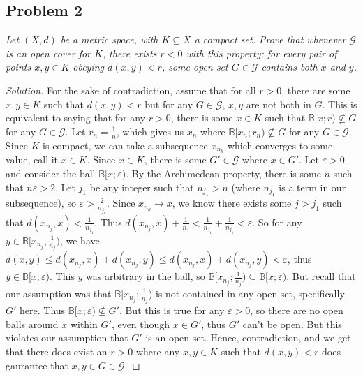 \documentclass{article}
\newcommand{\ep}{{\varepsilon}}
\begin{document}
\subsection*{Problem 2}
{\it Let $(X, d)$ be a metric space, with $K \subseteq X$ a compact set.
Prove that whenever $\mathcal{G}$ is an open cover for $K$,
there exists $r < 0$ with this property:
for every pair of points $x,y \in K$ obeying $d(x,y) < r$,
some open set $G \in \mathcal{G}$ contains both $x$ and $y$.}

\begin{proof}[Solution]\let\qed\relax
	For the sake of contradiction,
	assume that for all $r>0$, there are some $x, y \in K$ such that
	$d(x,y) < r$ but for any $G \in \mathcal{G}$, $x,y$ are not both in $G$.
	This is equivalent to saying that for any $r > 0$,
	there is some $x \in K$ such that
	$\mathbb{B}[x;r) \not\subseteq G$ for any $G \in \mathcal{G}$.
	Let $r_n = \frac{1}{n}$,
	which gives us $x_n$ where $\mathbb{B}[x_n;r_n) \not\subseteq G$
	for any $G \in \mathcal{G}$.
	Since $K$ is compact,
	we can take a subsequence $x_{n_k}$ which converges to some value,
	call it $x \in K$.
	Since $x \in K$, there is some $G' \in \mathcal{G}$ where $x \in G'$.
	Let $\ep > 0$ and consider the ball $\mathbb{B}[x;\ep)$.
	By the Archimedean property, there is some $n$ such that
	$n\ep>2$.
	Let $j_1$ be any integer such that $n_{j_1} > n$ (where $n_{j_1}$ is a term in our subsequence),
	so $\ep > \frac{2}{n_{j_1}}$.
	Since $x_{n_k} \to x$, we know there exists some $j > j_1$ such that
	$d(x_{n_j},x) < \frac{1}{n_{j_1}}$.
	Thus $d(x_{n_j},x) + \frac{1}{n_j} < \frac{1}{n_{j_1}} + \frac{1}{n_{j_1}} < \ep$.
	So for any $y \in \mathbb{B}[x_{n_j},\frac{1}{n_j})$,
	we have $d(x,y) \leq d(x_{n_j},x) + d(x_{n_j},y) \leq d(x_{n_j},x) + d(x_{n_j},y) < \ep$,
	thus $y \in \mathbb{B}[x;\ep)$.
	This $y$ was arbitrary in the ball, so
	$\mathbb{B}[x_{n_j};\frac{1}{n_j}) \subseteq \mathbb{B}[x;\ep)$.
	But recall that our assumption was that $\mathbb{B}[x_{n_j};\frac{1}{n_j})$
	is not contained in any open set, specifically $G'$ here.
	Thus $\mathbb{B}[x;\ep) \not\subseteq G'$.
	But this is true for any $\ep>0$,
	so there are no open balls around $x$ within $G'$,
	even though $x \in G'$, thus $G'$ can't be open.
	But this violates our assumption that $G'$ is an open set.
	Hence, contradiction,
	and we get that there does exist an $r>0$ where any $x,y \in K$
	such that $d(x,y)<r$ does gaurantee that $x,y \in G \in \mathcal{G}$.
\end{proof}
\clearpage
~\clearpage
\end{document}
